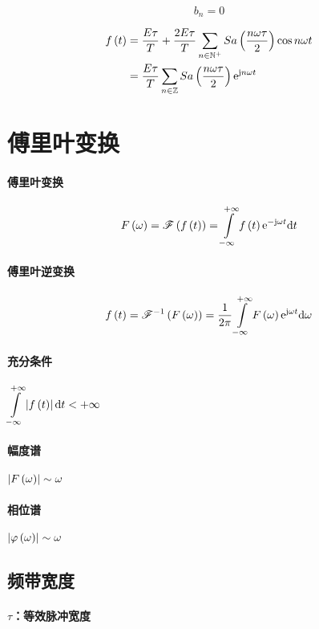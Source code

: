 \documentclass{article}
\begin{document}
\[b_n=0\]

\[\begin{aligned}
        f\left(t\right) & =\frac{E\tau}T+\frac{2E\tau}T\sum_{n\in\mathbb N^+}Sa\left(\frac{n\omega\tau}2\right)\cos n\omega t \\
            & =\frac{E\tau}T\sum_{n\in\mathbb Z} Sa\left(\frac{n\omega\tau}2\right)\mathrm e^{\mathrm j n\omega t}
    \end{aligned}\]

\section{傅里叶变换}

\paragraph{傅里叶变换}

\[\fw=\fourier\ft=\impint\ft\e^{-\j\omega t}\d t\]

\paragraph{傅里叶逆变换}

\[\ft=\ifourier{\fw}=\frac1{2\pi}\impint \fw\e^{\j\omega t}\d\omega\]

\paragraph{充分条件}

$\displaystyle\impint\abs\ft\d t<+\infty$

\paragraph{幅度谱}

$\left|F\left(\omega\right)\right|\sim\omega$

\paragraph{相位谱}

$\left|\varphi\left(\omega\right)\right|\sim \omega$

\subsection{频带宽度}

\paragraph{$\tau$：等效脉冲宽度}
\end{document}
